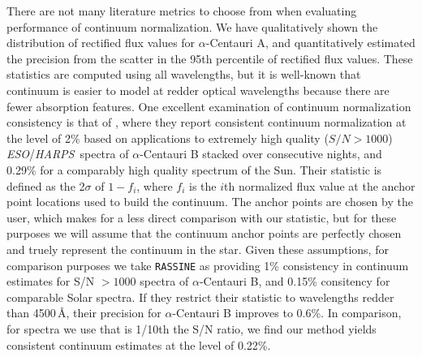 \documentclass[modern]{aastex631}
\newcommand{\project}[1]{\textit{#1}}
\newcommand{\eso}{\project{ESO}}
\newcommand{\harps}{\project{HARPS}}
\newcommand{\todo}[1]{\textcolor{tab:red}{#1}}
\begin{document}

There are not many literature metrics to choose from when evaluating performance of continuum normalization. We have qualitatively shown the distribution of rectified flux values for $\alpha$-Centauri A, and quantitatively estimated the precision from the scatter in the 95th percentile of rectified flux values. These statistics are computed using all wavelengths, but it is well-known that continuum is easier to model at redder optical wavelengths because there are fewer absorption features. One excellent examination of continuum normalization consistency is that of \citet{RASSINE}, where they report consistent continuum normalization at the level of 2\% based on applications to extremely high quality ($S/N > 1000$) \eso/\harps\ spectra of $\alpha$-Centauri B stacked over consecutive nights, and 0.29\% for a comparably high quality spectrum of the Sun. Their statistic is defined as the 2$\sigma$ of $1-f_i$, where $f_i$ is the $i$th normalized flux value at the anchor point locations used to build the continuum. The anchor points are chosen by the user, which makes for a less direct comparison with our statistic, but for these purposes we will assume that the continuum anchor points are perfectly chosen and truely represent the continuum in the star. Given these assumptions, for comparison purposes we take \texttt{RASSINE} as providing 1\% consistency in continuum estimates for S/N $> 1000$ spectra of $\alpha$-Centauri B, and 0.15\% consitency for comparable Solar spectra. If they restrict their statistic to wavelengths redder than 4500\,\AA, their precision for $\alpha$-Centauri B improves to 0.6\%. In comparison, for spectra we use that is 1/10th the S/N ratio, we find our method yields consistent continuum estimates at the level of 0.22\%.\\


\end{document}

